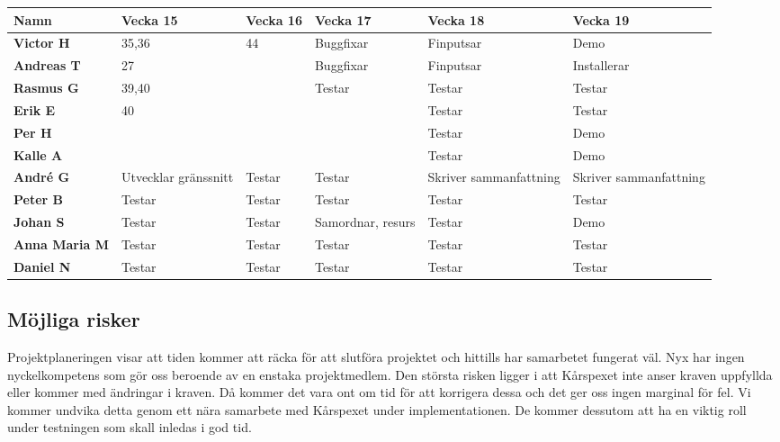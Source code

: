 \documentclass[a4paper, twoside, 11pt, titlepage]{article}
\begin{document}
	\begin {table} [ht] \begin{tabular} {  p{3.2cm} p{2cm} p{2cm} p{2cm} p{2cm} p{2cm} }
		\hline
		{\sffamily\textbf{Namn }} & {\sffamily\textbf{Vecka 15 }} & {\sffamily\textbf{Vecka 16 }} & {\sffamily\textbf{Vecka 17 }} & {\sffamily\textbf{Vecka 18 }} & {\sffamily\textbf{Vecka 19 }} \\
		\hline
		{\sffamily\textbf{Victor H }} & {35,36} & {44} & {Buggfixar} & {Finputsar} & { Demo } \\
		\hline
		{\sffamily\textbf{Andreas T}} & {27} & { } & {Buggfixar} & {Finputsar} & { Installerar } \\
		\hline
		{\sffamily\textbf{Rasmus G}} & {39,40} & { } & {Testar} & {Testar} & {Testar} \\
		\hline
		{\sffamily\textbf{Erik E}} & {40} & { } & {} & {Testar} & {Testar} \\
		\hline
		{\sffamily\textbf{Per H}} & { } & {} & { } & {Testar} & {Demo} \\
		\hline
		{\sffamily\textbf{Kalle A}} & { } & {} & { } & {Testar} & {Demo} \\
		\hline
		{\sffamily\textbf{André G}} & {Utvecklar gränssnitt} & {Testar} & {Testar} & {Skriver sammanfattning} & { Skriver sammanfattning } \\
		\hline
		{\sffamily\textbf{Peter B}} & {Testar} & {Testar} & {Testar} & {Testar} & {Testar} \\
		\hline
		{\sffamily\textbf{Johan S}} & {Testar} & {Testar} & {Samordnar, resurs} & {Testar} & {Demo} \\
		\hline
		{\sffamily\textbf{Anna Maria M}} & {Testar} & {Testar} & {Testar} & {Testar} & {Testar} \\
		\hline
		{\sffamily\textbf{Daniel N}} & {Testar} & {Testar} & {Testar} & {Testar} & {Testar} \\
		\hline
	\end{tabular} \end{table} \FloatBarrier


	\subsection{Möjliga risker}


	Projektplaneringen visar att tiden kommer att räcka för att slutföra projektet och hittills har samarbetet fungerat väl. Nyx har ingen nyckelkompetens som gör oss beroende av en enstaka projektmedlem. Den största risken ligger i att Kårspexet inte anser kraven uppfyllda eller kommer med ändringar i kraven. Då kommer det vara ont om tid för att korrigera dessa och det ger oss ingen marginal för fel. Vi kommer undvika detta genom ett nära samarbete med Kårspexet under implementationen. De kommer dessutom att ha en viktig roll under testningen som skall inledas i god tid.
\end{document}
